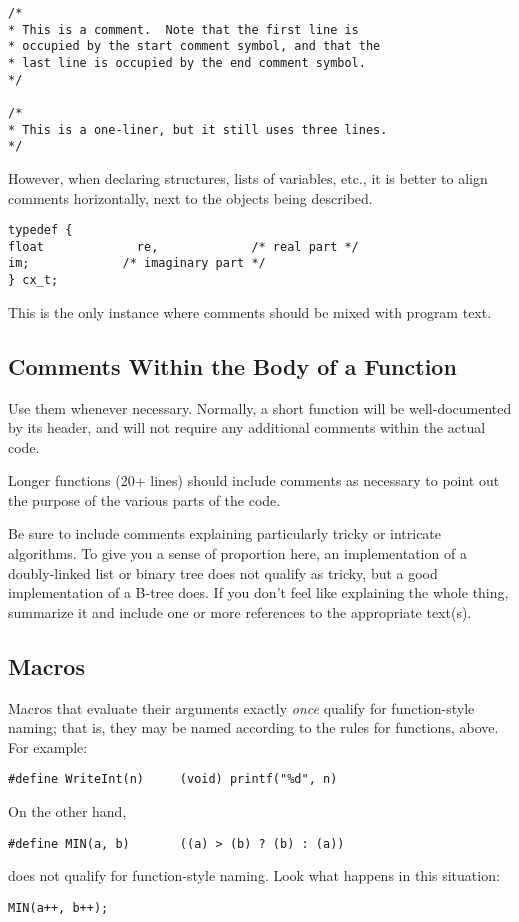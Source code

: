 \begin{verbatim}
/*
* This is a comment.  Note that the first line is
* occupied by the start comment symbol, and that the
* last line is occupied by the end comment symbol.
*/

/*
* This is a one-liner, but it still uses three lines.
*/
\end{verbatim}

However, when declaring structures, lists of variables, etc., it is
better to align comments horizontally, next to the objects being
described.
\begin{verbatim}
typedef {
float             re,             /* real part */
im;             /* imaginary part */
} cx_t;
\end{verbatim}

This is the only instance where comments should be mixed with program text.

\subsection{Comments Within the Body of a Function}

Use them whenever necessary.  Normally, a short function will be
well-documented by its header, and will not require any additional
comments within the actual code.

Longer functions (20+ lines) should include comments as necessary to point out
the purpose of the various parts of the code.

Be sure to include comments explaining particularly tricky or
intricate algorithms.  To give you a sense of proportion here, an
implementation of a doubly-linked list or binary tree does not qualify
as tricky, but a good implementation of a B-tree does.  If you don't
feel like explaining the whole thing, summarize it and include one or
more references to the appropriate text(s).

\subsection{Macros}

Macros that evaluate their arguments exactly {\em once} qualify for
function-style naming; that is, they may be named according to the
rules for functions, above.  For example:
\begin{verbatim}
#define WriteInt(n)     (void) printf("%d", n)
\end{verbatim}

On the other hand,
\begin{verbatim}
#define MIN(a, b)       ((a) > (b) ? (b) : (a))
\end{verbatim}
does not qualify for function-style naming.  Look what happens in this situation:
\begin{verbatim}
MIN(a++, b++);
\end{verbatim}

